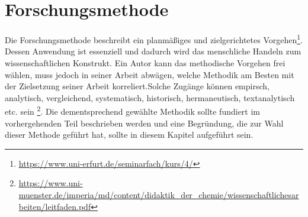 

\chapter{Forschungsmethode}
\label{chap:Forschungsmethode}


Die Forschungsmethode beschreibt ein planmäßiges und zielgerichtetes Vorgehen\footnote{\url{https://www.uni-erfurt.de/seminarfach/kurs/4/}}. Dessen Anwendung ist essenziell und dadurch wird das menschliche Handeln zum wissenschaftlichen Konstrukt. Ein Autor kann das methodische Vorgehen frei wählen, muss jedoch in seiner Arbeit abwägen, welche Methodik am Besten mit der Zielsetzung seiner Arbeit korreliert.Solche Zugänge können empirsch, analytisch, vergleichend, systematisch, historisch, hermaneutisch, textanalytisch etc. sein \footnote{\url{https://www.uni-muenster.de/imperia/md/content/didaktik_der_chemie/wissenschaftlichesarbeiten/leitfaden.pdf}}. Die dementsprechend gewählte Methodik sollte fundiert im vorhergehenden Teil beschrieben werden und eine Begründung, die zur Wahl dieser Methode geführt hat, sollte in diesem Kapitel aufgeführt sein. 













